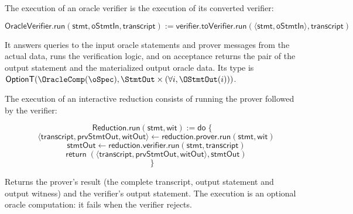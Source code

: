 \begin{definition}
    \label{def:oracle_verifier_run}
    The execution of an oracle verifier is the execution of its converted verifier:

    \begin{equation*} \mathsf{OracleVerifier}.\mathsf{run}(\mathsf{stmt}, \mathsf{oStmtIn}, \mathsf{transcript}) := \mathsf{verifier}.\mathsf{toVerifier}.\mathsf{run}(\langle \mathsf{stmt}, \mathsf{oStmtIn} \rangle, \mathsf{transcript}) \end{equation*}

    It answers queries to the input oracle statements and prover messages from the actual data,
    runs the verification logic, and on acceptance returns the pair of the output statement and
    the materialized output oracle data. Its type is
    \(\mathsf{OptionT}(\OracleComp(\oSpec), \StmtOut \times (\forall i, \OStmtOut(i)))\).
    \leanok
\end{definition}

\begin{definition}
    \label{def:reduction_run}
    The execution of an interactive reduction consists of running the prover followed by the verifier:

    \begin{equation*} \mathsf{Reduction}.\mathsf{run}(\mathsf{stmt}, \mathsf{wit}) := \mathsf{do} \; \{ \end{equation*}
    \begin{equation*} \quad \langle \mathsf{transcript}, \mathsf{prvStmtOut}, \mathsf{witOut} \rangle \leftarrow \mathsf{reduction}.\mathsf{prover}.\mathsf{run}(\mathsf{stmt}, \mathsf{wit}) \end{equation*}
    \begin{equation*} \quad \mathsf{stmtOut} \leftarrow \mathsf{reduction}.\mathsf{verifier}.\mathsf{run}(\mathsf{stmt}, \mathsf{transcript}) \end{equation*}
    \begin{equation*} \quad \mathsf{return} \; (\langle \mathsf{transcript}, \mathsf{prvStmtOut}, \mathsf{witOut} \rangle, \mathsf{stmtOut}) \end{equation*}
    \begin{equation*} \} \end{equation*}

    Returns the prover's result (the complete transcript, output statement and output witness)
    and the verifier's output statement. The execution is an optional oracle computation: it fails
    when the verifier rejects.
    \leanok
\end{definition}


